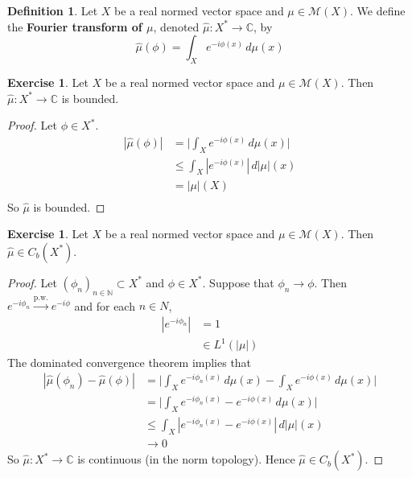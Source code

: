 \documentclass{book}
\theoremstyle{definition}
\newtheorem{defn}[definition]{Definition}
\newtheorem{ex}[definition]{Exercise}
\newcommand{\C}{\mathbb{C}}
\newcommand{\N}{\mathbb{N}}
\newcommand{\MM}{\mathcal{M}}
\DeclareMathOperator*{\0}{\mbf{0}}
\DeclareMathOperator*{\1}{\mbf{1}}
\newcommand{\convt}[1]{\xrightarrow{\text{#1}}}
\newcommand{\dmu}{\, d \mu}
\begin{document}
	\begin{defn}
		Let $X$ be a real normed vector space and $\mu \in \MM(X)$. We define the \textbf{Fourier transform of $\mu$}, denoted $\hat{\mu}: X^* \rightarrow \C$, by
		$$\hat{\mu}(\phi) = \int_X e^{-i\phi(x)} \dmu(x)$$ 
	\end{defn}
	
	\begin{ex}
		Let $X$ be a real normed vector space and $\mu \in \MM(X)$. Then $\hat{\mu} : X^* \rightarrow \C$ is bounded.
	\end{ex}
	
	\begin{proof}
		Let $\phi \in X^*$. 
		\begin{align*}
			|\hat{\mu}(\phi)|
			& = \bigg | \int_X e^{-i \phi(x)} \dmu(x) \bigg| \\
			& \leq \int_X |e^{-i \phi(x)}| \, d|\mu|(x) \\
			& = |\mu|(X) \\
		\end{align*}
		So $\hat{\mu}$ is bounded.
	\end{proof}
	
	\begin{ex}
		Let $X$ be a real normed vector space and $\mu \in \MM(X)$. Then $\hat{\mu} \in C_b(X^*)$.
	\end{ex}
	
	\begin{proof}
		Let $(\phi_{n})_{n \in \N} \subset X^*$ and $\phi \in X^*$. Suppose that $\phi_n \rightarrow \phi$. Then $e^{-i \phi_n} \convt{p.w.} e^{-i\phi}$ and for each $n \in N$, 
		\begin{align*}
			|e^{-i \phi_n}| 
			& = 1 \\
			& \in L^1(|\mu|)
		\end{align*}
		The dominated convergence theorem implies that
		\begin{align*}
			|\hat{\mu}(\phi_n) - \hat{\mu}(\phi)| 
			& = \bigg| \int_X e^{-i \phi_n(x)} \dmu(x) - \int_X e^{-i \phi(x)} \dmu(x)\bigg| \\
			& =  \bigg| \int_X e^{-i \phi_n(x)} - e^{-i \phi(x)} \dmu(x) \bigg| \\
			& \leq \int_X |e^{-i \phi_n(x)} - e^{-i \phi(x)}| \, d|\mu|(x) \\
			& \rightarrow 0
		\end{align*}
		So $\hat{\mu}: X^* \rightarrow \C$ is continuous (in the norm topology). Hence $\hat{\mu} \in C_b(X^*)$.
	\end{proof}
	
\end{document}
